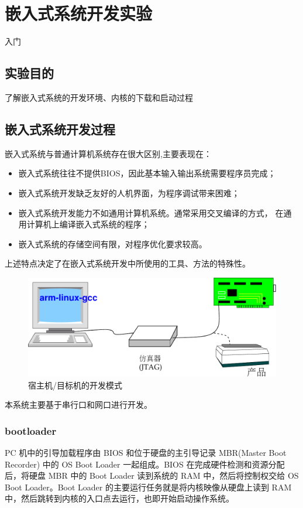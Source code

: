\chapter{嵌入式系统开发实验}{入门}\label{ch-env}

\section{实验目的}
    了解嵌入式系统的开发环境、内核的下载和启动过程

\section{嵌入式系统开发过程}
    嵌入式系统与普通计算机系统存在很大区别,主要表现在：
\begin{itemize}
  \item 嵌入式系统往往不提供BIOS，因此基本输入输出系统需要程序员完成；
  \item 嵌入式系统开发缺乏友好的人机界面，为程序调试带来困难；
  \item 嵌入式系统开发能力不如通用计算机系统。通常采用交叉编译的方式，
        在通用计算机上编译嵌入式系统的程序；
  \item 嵌入式系统的存储空间有限，对程序优化要求较高。
\end{itemize}
    上述特点决定了在嵌入式系统开发中所使用的工具、方法的特殊性。

\begin{figure}[!h]
\centering
  \includegraphics[width=.55\textwidth]{host-obj}
\caption{宿主机/目标机的开发模式}
\end{figure}

    本系统主要基于串行口和网口进行开发。

\subsection{bootloader}
	PC 机中的引导加载程序由 BIOS 和位于硬盘的主引导记录 MBR(Master Boot
Recorder) 中的 OS Boot Loader 一起组成。BIOS 在完成硬件检测和资源分配
后，将硬盘 MBR 中的 Boot Loader 读到系统的 RAM 中，然后将控制权交给
OS Boot Loader。Boot Loader 的主要运行任务就是将内核映像从硬盘上读到
RAM 中，然后跳转到内核的入口点去运行，也即开始启动操作系统。

